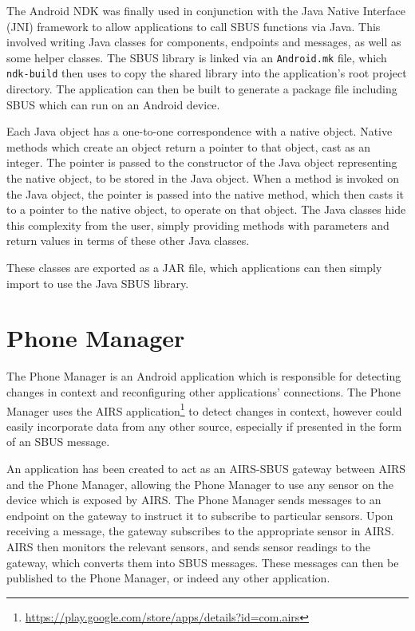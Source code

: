 \documentclass[12pt,twoside,notitlepage]{report}
\begin{document}
The Android NDK was finally used in conjunction with the Java Native Interface (JNI) framework to allow applications to call SBUS functions via Java. 
This involved writing Java classes for components, endpoints and messages, as well as some helper classes. 
The SBUS library is linked via an {\tt Android.mk} file, which {\tt ndk-build} then uses to copy the shared library into the application's root project directory. 
The application can then be built to generate a package file including SBUS which can run on an Android device. 

Each Java object has a one-to-one correspondence with a native object. 
Native methods which create an object return a pointer to that object, cast as an integer. 
The pointer is passed to the constructor of the Java object representing the native object, to be stored in the Java object. 
When a method is invoked on the Java object, the pointer is passed into the native method, which then casts it to a pointer to the native object, to operate on that object. 
The Java classes hide this complexity from the user, simply providing methods with parameters and return values in terms of these other Java classes.

These classes are exported as a JAR file, which applications can then simply import to use the Java SBUS library.

\section{Phone Manager}

The Phone Manager is an Android application which is responsible for detecting changes in context and reconfiguring other applications' connections. 
The Phone Manager uses the AIRS application\footnote{\url{https://play.google.com/store/apps/details?id=com.airs}} to detect changes in context, however could easily incorporate data from any other source, especially if presented in the form of an SBUS message. 

An application has been created to act as an AIRS-SBUS gateway between AIRS and the Phone Manager, allowing the Phone Manager to use any sensor on the device which is exposed by AIRS. 
The Phone Manager sends messages to an endpoint on the gateway to instruct it to subscribe to particular sensors. 
Upon receiving a message, the gateway subscribes to the appropriate sensor in AIRS. 
AIRS then monitors the relevant sensors, and sends sensor readings to the gateway, which converts them into SBUS messages. 
These messages can then be published to the Phone Manager, or indeed any other application. 
 
\end{document}
